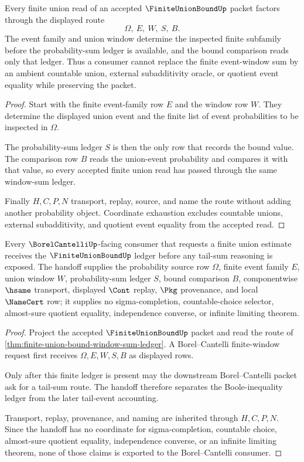\begin{theorem}
\label{thm:finite-union-bound-window-sum-ledger}
Every finite union read of an accepted $\FiniteUnionBoundUp$ packet factors through the displayed route
$$
\Omega,\ E,\ W,\ S,\ B.
$$
The event family and union window determine the inspected finite subfamily before the probability-sum ledger is available, and the bound comparison reads only that ledger. Thus a consumer cannot replace the finite event-window sum by an ambient countable union, external subadditivity oracle, or quotient event equality while preserving the packet.
\end{theorem}
\begin{proof}
Start with the finite event-family row $E$ and the window row $W$. They determine the displayed union event and the finite list of event probabilities to be inspected in $\Omega$.

The probability-sum ledger $S$ is then the only row that records the bound value. The comparison row $B$ reads the union-event probability and compares it with that value, so every accepted finite union read has passed through the same window-sum ledger.

Finally $H,C,P,N$ transport, replay, source, and name the route without adding another probability object. Coordinate exhaustion excludes countable unions, external subadditivity, and quotient event equality from the accepted read.
\end{proof}

\begin{theorem}
\label{thm:finite-union-bound-borel-cantelli-handoff}
Every $\BorelCantelliUp$-facing consumer that requests a finite union estimate receives the $\FiniteUnionBoundUp$ ledger before any tail-sum reasoning is exposed. The handoff supplies the probability source row $\Omega$, finite event family $E$, union window $W$, probability-sum ledger $S$, bound comparison $B$, componentwise $\hsame$ transport, displayed $\Cont$ replay, $\Pkg$ provenance, and local $\NameCert$ row; it supplies no sigma-completion, countable-choice selector, almost-sure quotient equality, independence converse, or infinite limiting theorem.
\end{theorem}
\begin{proof}
Project the accepted $\FiniteUnionBoundUp$ packet and read the route of \autoref{thm:finite-union-bound-window-sum-ledger}. A Borel--Cantelli finite-window request first receives $\Omega,E,W,S,B$ as displayed rows.

Only after this finite ledger is present may the downstream Borel--Cantelli packet ask for a tail-sum route. The handoff therefore separates the Boole-inequality ledger from the later tail-event accounting.

Transport, replay, provenance, and naming are inherited through $H,C,P,N$. Since the handoff has no coordinate for sigma-completion, countable choice, almost-sure quotient equality, independence converse, or an infinite limiting theorem, none of those claims is exported to the Borel--Cantelli consumer.
\end{proof}

